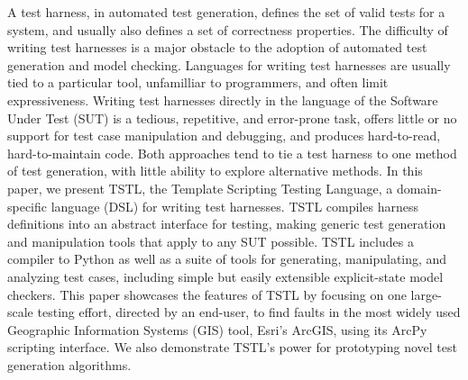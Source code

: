 A test harness, in automated test generation, defines the set of valid tests
for a system, and usually also defines a set of correctness
properties.  The difficulty of writing test harnesses is a major
obstacle to the adoption of automated test generation and model
checking.  Languages for writing test harnesses are usually tied to a
particular tool, unfamilliar to programmers, and often limit
expressiveness.  Writing test harnesses directly in the language of
the Software Under Test (SUT) is a tedious, repetitive, and
error-prone task, offers little or no support for test case
manipulation and debugging, and produces hard-to-read, hard-to-maintain
code.  Both approaches tend to tie a test harness to one method of
test generation, with little ability to explore alternative methods.
In this paper, we present TSTL, the Template Scripting Testing
Language, a domain-specific language (DSL) for writing test harnesses.
TSTL compiles harness definitions into an abstract 
interface for testing, making generic
test generation and manipulation tools that apply to any SUT possible.  TSTL includes a
compiler to Python as well as a suite of tools for generating, manipulating,
and analyzing test cases, including simple but easily extensible explicit-state model
checkers.  This paper showcases the features of TSTL by focusing on
one large-scale testing effort, directed by an end-user, to find
faults in the most widely used Geographic Information Systems (GIS) tool,
Esri's ArcGIS, using its ArcPy scripting interface.  We also
demonstrate TSTL's power for prototyping novel test generation algorithms.



